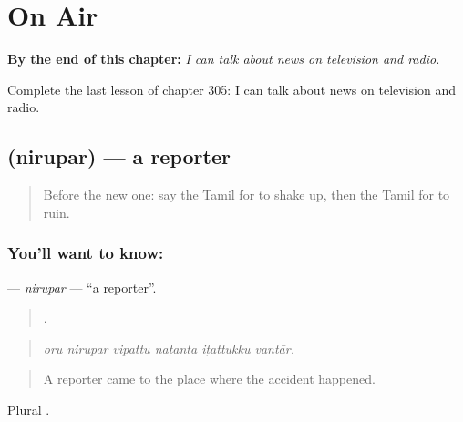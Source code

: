 
\chapter{On Air}
\label{ch:ta-on-air}

\begin{chapteropening}
\textbf{By the end of this chapter:} \emph{I can talk about news on television and radio.}

Complete the last lesson of chapter 305: I can talk about news on television and radio.
\end{chapteropening}

\section[\texorpdfstring{\ta{நிருபர்} (nirupar)}{நிருபர் (nirupar)}]{ (nirupar) — a reporter}

\label{lesson:TA-C305-nirupar}



\begin{quote}
Before the new one: say the Tamil for to shake up, then the Tamil for to ruin.
\end{quote}

\subsection*{You'll want to know: }
\textbf{} — \emph{nirupar} — \textquotedblleft{}a reporter\textquotedblright{}.

\begin{quote}
     .
\end{quote}

\begin{quote}
\emph{oru nirupar vipattu naṭanta iṭattukku vantār.}
\end{quote}

\begin{quote}
A reporter came to the place where the accident happened.
\end{quote}

Plural .

